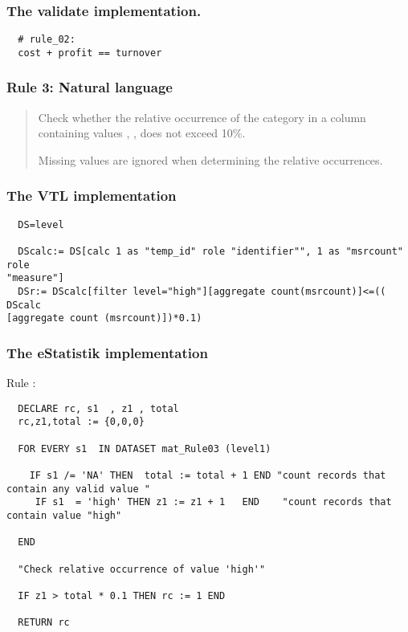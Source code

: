 \subsubsection*{The validate implementation.}
\begin{verbatim}
  # rule_02:
  cost + profit == turnover
\end{verbatim}


\newpage

\subsubsection*{  Rule 3: Natural language}
\begin{quote}


Check whether the relative occurrence of the category  in a column containing values , ,  does not exceed 10\%.

Missing values are ignored when determining the relative occurrences.


\end{quote}

\subsubsection*{The VTL implementation}
\begin{verbatim}
  DS=level

  DScalc:= DS[calc 1 as "temp_id" role "identifier"", 1 as "msrcount" role
"measure"]
  DSr:= DScalc[filter level="high"][aggregate count(msrcount)]<=(( DScalc
[aggregate count (msrcount)])*0.1)
\end{verbatim}

\subsubsection*{The eStatistik implementation}
\noindent
Rule :
\begin{verbatim}
  DECLARE rc, s1  , z1 , total
  rc,z1,total := {0,0,0}

  FOR EVERY s1  IN DATASET mat_Rule03 (level1)

    IF s1 /= 'NA' THEN  total := total + 1 END "count records that contain any valid value "
     IF s1  = 'high' THEN z1 := z1 + 1   END    "count records that contain value "high"

  END

  "Check relative occurrence of value 'high'"

  IF z1 > total * 0.1 THEN rc := 1 END

  RETURN rc
\end{verbatim}

